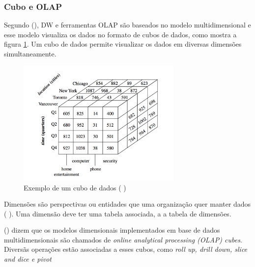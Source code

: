 \subsubsection{Cubo e OLAP}
Segundo \citeauthor{jmj} (\citeyear{jmj}), DW e ferramentas OLAP são baseados no modelo multidimensional e esse modelo visualiza os dados no formato de cubos de dados, como mostra a figura \ref{cube}. Um cubo de dados permite visualizar os dados em diversas dimensões simultaneamente.
\begin{figure}[ht]
\centering
\includegraphics[height=6.2cm]{imagens/datacube.png}
\caption{Exemplo de um cubo de dados (\citeauthor{jmj} \citeyear{jmj})}
\label{cube}
\end{figure}
Dimensões são perspectivas ou entidades que uma organização quer manter dados (\citeauthor{jmj} \citeyear{jmj}). Uma dimensão deve ter uma tabela associada, a a tabela de dimensões.


\citeauthor{kimball2013} (\citeyear{kimball2013}) dizem que os modelos dimensionais implementados em base de dados multidimensionais são chamados de \textit{online analytical processing (OLAP) cubes}. Diversãs operações estão associadas a esses cubos, como \textit{roll up, drill down, slice and dice e pivot}

